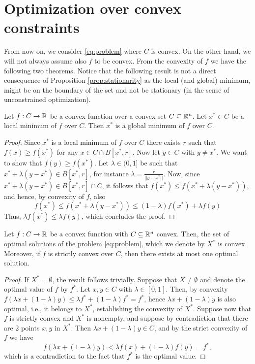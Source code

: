 \documentclass[10pt,a4paper]{article}
\begin{document}
\section{Optimization over convex constraints}
From now on, we consider \eqref{eq:problem} where $C$ is convex. On the other hand, we will not always assume also $f$ to be convex. From the convexity of $f$ we have the following two theorems. Notice that the following result is not a direct consequence of Proposition \ref{prop:stationarity} as the local (and global) minimum, might be on the boundary of the set and not be stationary (in the sense of unconstrained optimization).
\begin{theorem}[global=local in convex optimization] Let $f:C\to\mathbb{R}$ be a convex function over a convex set $C\subseteq \mathbb{R}^n$. Let $x^*\in C$ be a local minimum of $f$ over $C$. Then $x^*$ is a global minimum of $f$ over $C$.	
\end{theorem}
\begin{proof}
	Since $x^*$ is a local minimum of $f$ over $C$ there exists $r$ such that $f(x)\geq f(x^*)$ for any $x\in C \cap B[x^*,r]$. Now let $y\in C$ with $y\neq x^*$. We want to show that $f(y) \geq f(x^*)$. Let $\lambda\in(0,1]$ be such that $x^*+\lambda(y-x^*)\in B[x^*,r]$, for instance $\lambda=\frac{r}{||y-x^*||}$. Now, since $x^*+\lambda (y-x^*) \in B[x^*,r]\cap C$, it follows that $f(x^*)\leq f(x^*+\lambda (y-x^*))$, and hence, by convexity of $f$, also 
	\begin{equation*}
		f(x^*)\leq f(x^*+\lambda (y-x^*)) \leq (1-\lambda)f(x^*) +\lambda f(y)
	\end{equation*}
Thus, $\lambda f(x^*) \leq \lambda f(y)$, which concludes the proof.
\end{proof}
\begin{theorem}\label{thm:unique}
	Let $f:C\to \mathbb{R}$ be a convex function with $C\subseteq \mathbb{R}^n$ convex. Then, the set of optimal solutions of the problem \eqref{eq:problem}, which we denote by $X^*$ is convex. Moreover, if $f$ is strictly convex over $C$, then there exists at most one optimal solution.
\end{theorem}
\begin{proof}
	If $X^*=\emptyset$, the result follows trivially. Suppose that $X\neq\emptyset$ and denote the optimal value of $f$ by $f^*$. Let $x,y\in C$ with $\lambda\in[0,1]$. Then, by convexity $f(\lambda x+(1-\lambda)y)\leq \lambda f^* +(1-\lambda)f^*= f^*$, hence $\lambda x +(1-\lambda)y$ is also optimal, i.e., it belongs to $X^*$, establishing the convexity of $X^*$. Suppose now that $f$ is strictly convex and $X^*$ is nonempty, and suppose by contradiction that there are 2 points $x,y$ in $X^*$. Then $\lambda x +(1-\lambda)y \in C$, and by the strict convexity of $f$ we have 
	\begin{equation*}
		f(\lambda x +(1-\lambda) y) < \lambda f(x) + (1-\lambda) f(y) = f^*,
	\end{equation*}
which is a contradiction to the fact that $f^*$ is the optimal value.
\end{proof}
\end{document}
